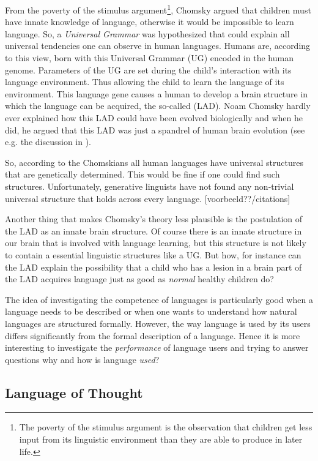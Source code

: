 From the poverty of the stimulus argument\footnote{The poverty of the stimulus argument is the observation that children get less input from its linguistic environment than they are able to produce in later life.}, Chomsky argued that children must have innate knowledge of language, otherwise it would be impossible to learn language. So, a {\em Universal Grammar} was hypothesized that could explain all universal tendencies one can observe in human languages. Humans are, according to this view, born with this Universal Grammar (UG) encoded in the human genome. Parameters of the UG are set during the child's interaction with its language environment. Thus allowing the child to learn the language of its environment. This language gene causes a human to develop a brain structure in which the language can be acquired, the so-called  (LAD). Noam Chomsky hardly ever explained how this LAD could have been evolved biologically and when he did, he argued that this LAD was just a spandrel of human brain evolution (see e.g. the discussion in \cite{pinkerbloom:1990,dennett:1995}).

So, according to the Chomskians all human languages have universal structures that are genetically determined. This would be fine if one could find such structures. Unfortunately, generative linguists have not found any non-trivial universal structure that holds across every language. [voorbeeld??/citations]

Another thing that makes Chomsky's theory less plausible is the postulation of the LAD as an innate brain structure. Of course there is an innate structure in our brain that is involved with language learning, but this structure is not likely to contain a essential linguistic structures like a UG. But how, for instance can the LAD explain the possibility that a child who has a lesion in a brain part of the LAD acquires language just as good as {\em normal} healthy children do?

The idea of investigating the competence of languages is particularly good when a language needs to be described or when one wants to understand how natural languages are structured formally. However, the way language is used by its users differs significantly from the formal description of a language. Hence it is more interesting to investigate the {\em performance} of language users and trying to answer questions why and how is language {\em used}?

\subsection{Language of Thought}\label{s:theory:fodor}

